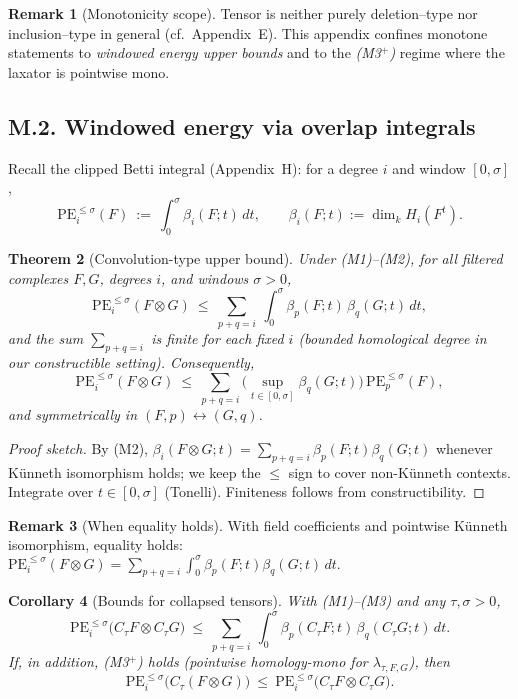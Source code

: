 \documentclass[11pt]{article}
\DeclareRobustCommand{\hyp}{\nobreakdash-}
\numberwithin{equation}{section}
\newtheorem{theorem}{Theorem}[section]
\newtheorem{corollary}[theorem]{Corollary}
\theoremstyle{definition}
\newtheorem{remark}[theorem]{Remark}
\begin{document}
\begin{remark}[Monotonicity scope]
Tensor is neither purely deletion–type nor inclusion–type in general (cf.\ Appendix~E). This appendix confines monotone statements to \emph{windowed energy upper bounds} and to the \emph{(M3$^{+}$)} regime where the laxator is pointwise mono.
\end{remark}

\subsection*{M.2. Windowed energy via overlap integrals}
Recall the clipped Betti integral (Appendix~H): for a degree \(i\) and window \([0,\sigma]\),
\[
\mathrm{PE}_i^{\le \sigma}(F)\ :=\ \int_0^\sigma \beta_i(F;t)\,dt,\qquad \beta_i(F;t):=\dim_k H_i(F^t).
\]

\begin{theorem}[Convolution-type upper bound]\label{M:thm:conv}
Under \emph{(M1)–(M2)}, for all filtered complexes \(F,G\), degrees \(i\), and windows \(\sigma>0\),
\[
  \mathrm{PE}_i^{\le \sigma}(F\otimes G)\ \le\ \sum_{p+q=i}\ \int_0^\sigma \beta_p(F;t)\,\beta_q(G;t)\,dt,
\]
and the sum \(\sum_{p+q=i}\) is finite for each fixed \(i\) (bounded homological degree in our constructible setting).
Consequently,
\[
  \mathrm{PE}_i^{\le \sigma}(F\otimes G)\ \le\ \sum_{p+q=i}\Big(\sup_{t\in[0,\sigma]}\beta_q(G;t)\Big)\,\mathrm{PE}_p^{\le \sigma}(F),
\]
and symmetrically in \((F,p)\leftrightarrow(G,q)\).
\end{theorem}

\begin{proof}[Proof sketch]
By (M2), \(\beta_i(F\otimes G;t)=\sum_{p+q=i}\beta_p(F;t)\beta_q(G;t)\) whenever Künneth isomorphism holds; we keep the \(\le\) sign to cover non\hyp Künneth contexts. Integrate over \(t\in[0,\sigma]\) (Tonelli). Finiteness follows from constructibility.
\end{proof}

\begin{remark}[When equality holds]\label{M:rk:eq}
With field coefficients and pointwise Künneth isomorphism, equality holds:
\(\mathrm{PE}_i^{\le \sigma}(F\otimes G)=\sum_{p+q=i}\int_0^\sigma \beta_p(F;t)\beta_q(G;t)\,dt.\)
\end{remark}

\begin{corollary}[Bounds for collapsed tensors]\label{M:cor:collapsed}
With \emph{(M1)–(M3)} and any \(\tau,\sigma>0\),
\[
  \mathrm{PE}_i^{\le \sigma}\!\big(C_\tau F \otimes C_\tau G\big)\ \le\ \sum_{p+q=i}\ \int_0^\sigma \beta_p(C_\tau F;t)\,\beta_q(C_\tau G;t)\,dt.
\]
If, in addition, \emph{(M3$^{+}$)} holds (pointwise homology-mono for \(\lambda_{\tau,F,G}\)), then
\[
  \mathrm{PE}_i^{\le \sigma}\!\big(C_\tau(F\otimes G)\big)\ \le\ \mathrm{PE}_i^{\le \sigma}\!\big(C_\tau F \otimes C_\tau G\big).
\]
\end{corollary}
\end{document}

